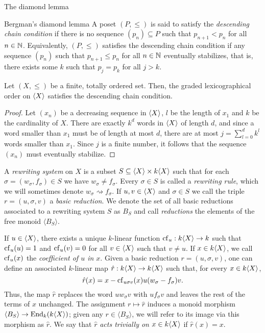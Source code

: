 \begin{chapter}{The diamond lemma}
\begin{section}{Bergman's diamond lemma}
A poset $(P,\leq)$ is said to satisfy the \emph{descending chain condition} if there is no sequence $(p_n)\subseteq P$ such that $p_{n+1}< p_n$ for all $n\in\mathbb{N}$. Equivalently, $(P,\leq)$ satisfies the descending chain condition if any sequence $(p_n)$ such that $p_{n+1} \leq p_n$ for all $n\in\mathbb{N}$ eventually stabilizes, that is, there exists some $k$ such that $p_j = p_k$ for all $j>k$.

\begin{lemma}\label{noeth} Let $(X,\leq)$ be a finite, totally ordered set. Then, the graded lexicographical order on $\langle X\rangle$ satisfies the descending chain condition.
\end{lemma}
\begin{proof} Let $(x_n)$ be a decreasing sequence in $\langle X\rangle$, $l$ be the length of $x_1$ and $k$ be the cardinality of $X$. There are exactly $k^d$ words in $\langle X\rangle$ of length $d$, and since a word smaller than $x_1$ must be of length at most $d$, there are at most $j=\sum_{l=0}^d k^l$ words smaller than $x_1$. Since $j$ is a finite number, it follows that the sequence $(x_n)$ must eventually stabilize.
\end{proof}

A \emph{rewriting system} on $X$ is a subset $S\subseteq \langle X\rangle \times k\langle X\rangle$ such that for each $\sigma=(w_\sigma, f_\sigma)\in S$ we have $w_\sigma \neq f_\sigma$. Every $\sigma \in S$ is called a \emph{rewriting rule}, which we will sometimes denote $w_\sigma \rightsquigarrow f_\sigma$. If $u,v\in\langle X\rangle$ and $\sigma\in S$ we call the triple $r=(u,\sigma,v)$ a \emph{basic reduction}. We denote the set of all basic reductions associated to a rewriting system $S$ as $B_S$ and call \emph{reductions} the elements of the free monoid $\langle B_S\rangle$.

If $u\in\langle X\rangle$, there exists a unique $k$-linear function $\mathrm{cf}_u:k\langle X\rangle\to k$ such that $\mathrm{cf}_u(u)=1$ and $\mathrm{cf}_u(v)=0$ for all $v\in\langle X\rangle$ such that $v\neq u$. If $x\in k\langle X\rangle$, we call $\mathrm{cf}_u(x)$ the \emph{coefficient of $u$ in $x$}. Given a basic reduction $r=(u,\sigma,v)$, one can define an associated $k$-linear map $\hat{r}:k\langle X\rangle\to k\langle X\rangle$ such that, for every $x\in k\langle X\rangle$,
\[\hat{r}(x)=x-\mathrm{cf}_{u\sigma v}(x) u(w_\sigma - f_\sigma)v.\]
Thus, the map $\hat{r}$ replaces the word $uw_\sigma v$ with $uf_\sigma v$ and leaves the rest of the terms of $x$ unchanged. The assignment $r\mapsto \hat{r}$ induces a monoid morphism $\langle B_S\rangle \to \operatorname{End}_k(k\langle X\rangle)$; given any $r\in\langle B_S\rangle$, we will refer to its image via this morphism as $\hat{r}$. We say that $\hat{r}$ \emph{acts trivially on $x\in k\langle X\rangle$} if $\hat{r}(x)=x$.


\end{section}
\end{chapter}
